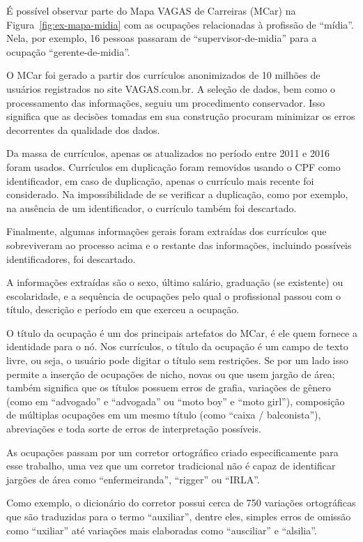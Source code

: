 \documentclass[
  article,
  11pt,
  a4paper,
  english,
  brazil,
  sumario=tradicional]{abntex2}
\begin{document}
É possível observar parte do Mapa VAGAS de Carreiras (MCar) na Figura~\ref{fig:ex-mapa-midia} com as ocupações relacionadas à profissão de \enquote{mídia}. Nela, por exemplo, 16 pessoas passaram de \enquote{supervisor-de-midia} para a ocupação \enquote{gerente-de-midia}.

O MCar foi gerado a partir dos currículos anonimizados de 10 milhões de usuários registrados no site VAGAS.com.br. A seleção de dados, bem como o processamento das informações, seguiu um procedimento conservador. Isso significa que as decisões tomadas em sua construção procuram minimizar os erros decorrentes da qualidade dos dados.

Da massa de currículos, apenas os atualizados no período entre 2011 e 2016 foram usados. Currículos em duplicação foram removidos usando o CPF como identificador, em caso de duplicação, apenas o currículo mais recente foi considerado. Na impossibilidade de se verificar a duplicação, como por exemplo, na ausência de um identificador, o currículo também foi descartado.

Finalmente, algumas informações gerais foram extraídas dos currículos que sobreviveram ao processo acima e o restante das informações, incluindo possíveis identificadores, foi descartado.

A informações extraídas são o sexo, último salário, graduação (se existente) ou escolaridade, e a sequência de ocupações pelo qual o profissional passou com o título, descrição e período em que exerceu a ocupação.

O título da ocupação é um dos principais artefatos do MCar, é ele quem fornece a identidade para o nó. Nos currículos, o título da ocupação é um campo de texto livre, ou seja, o usuário pode digitar o título sem restrições. Se por um lado isso permite a inserção de ocupações de nicho, novas ou que usem jargão de área; também significa que os títulos possuem erros de grafia, variações de gênero (como em \enquote{advogado} e \enquote{advogada} ou \enquote{moto boy} e \enquote{moto girl}), composição de múltiplas ocupações em um mesmo título (como \enquote{caixa / balconista}), abreviações e toda sorte de erros de interpretação possíveis.

As ocupações passam por um corretor ortográfico criado especificamente para esse trabalho, uma vez que um corretor tradicional não é capaz de identificar jargões de área como \enquote{enfermeiranda}, \enquote{rigger} ou \enquote{IRLA}.

Como exemplo, o dicionário do corretor possui cerca de 750 variações ortográficas que são traduzidas para o termo \enquote{auxiliar}, dentre eles, simples erros de omissão como \enquote{uxiliar} até variações mais elaboradas como \enquote{ausciliar} e \enquote{alsilia}.
\end{document}
